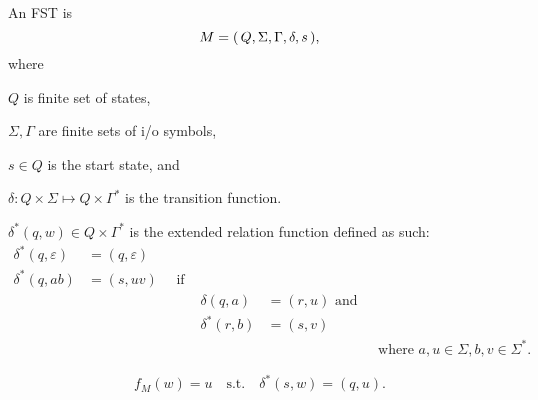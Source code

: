 \begin{definition}
    An FST is 
    \[
        M = { \left(\, Q,\Sigma,\Gamma,\delta,s \,\right) }
    ,\]
    where
    \begin{compactitem}
    \item $Q$ is finite set of states,
    \item $\Sigma, \Gamma$ are finite sets of i/o symbols,
    \item $s \in Q$ is the start state, and
    \item $\delta \colon Q \times \Sigma \mapsto Q \times \Gamma^*$
        is the transition function.
    \end{compactitem}
\end{definition}

\begin{definition}
    $
    \delta^*(q,w) \in Q \times \Gamma^*
    $
    is the extended relation function defined as such:
    \begin{align*}
        \delta^*(q,\varepsilon) &= (q,\varepsilon) \\
        \delta^*(q,ab)          &= (s,uv) \quad \text{ if } \\
                                && \delta(q,a)   &= (r,u) \text{ and } \\
                                && \delta^*(r,b) &= (s,v) \\
                                &&&& \text{ where $a,u \in \Sigma, b,v \in \Sigma^*$}
    .\end{align*}
\end{definition}

\begin{definition}[$f_M$ of an FST]
\[
    f_M(w) = u \quad\text{s.t.}\quad \delta^*(s,w) = (q,u)
.\]
\end{definition}

